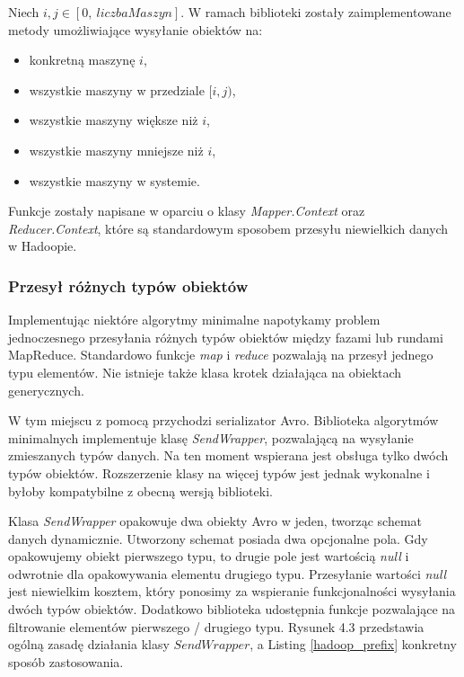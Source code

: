 \documentclass[magisterska]{pracamgr}
\begin{document}
Niech \(i, j \in [0, \ liczbaMaszyn]\). W ramach biblioteki zostały zaimplementowane metody umożliwiające wysyłanie obiektów na:
\begin{itemize}
    \item konkretną maszynę \(i\),
    \item wszystkie maszyny w przedziale \([i, j)\),
    \item wszystkie maszyny większe niż \(i\),
    \item wszystkie maszyny mniejsze niż \(i\),
    \item wszystkie maszyny w systemie.
\end{itemize}

Funkcje zostały napisane w oparciu o klasy \textit{Mapper.Context} oraz \textit{Reducer.Context}, które są standardowym sposobem przesyłu niewielkich danych w Hadoopie.

\subsubsection{Przesył różnych typów obiektów} \label{hadoop_przesyl_obiektow}

Implementując niektóre algorytmy minimalne napotykamy problem jednoczesnego przesyłania różnych typów obiektów między fazami lub rundami MapReduce. Standardowo funkcje \textit{map} i \textit{reduce} pozwalają na przesył jednego typu elementów. Nie istnieje także klasa krotek działająca na obiektach generycznych.

W tym miejscu z pomocą przychodzi serializator Avro. Biblioteka algorytmów minimalnych implementuje klasę \textit{SendWrapper}, pozwalającą na wysyłanie zmieszanych typów danych. Na ten moment wspierana jest obsługa tylko dwóch typów obiektów. Rozszerzenie klasy na więcej typów jest jednak wykonalne i byłoby kompatybilne z obecną wersją biblioteki.

Klasa \textit{SendWrapper} opakowuje dwa obiekty Avro w jeden, tworząc schemat danych dynamicznie. Utworzony schemat posiada dwa opcjonalne pola. Gdy opakowujemy obiekt pierwszego typu, to drugie pole jest wartością \textit{null} i odwrotnie dla opakowywania elementu drugiego typu. Przesyłanie wartości \textit{null} jest niewielkim kosztem, który ponosimy za wspieranie funkcjonalności wysyłania dwóch typów obiektów. Dodatkowo biblioteka udostępnia funkcje pozwalające na filtrowanie elementów pierwszego / drugiego typu. Rysunek 4.3 przedstawia ogólną zasadę działania klasy \(SendWrapper\), a Listing \ref{hadoop_prefix} konkretny sposób zastosowania.
\end{document}
